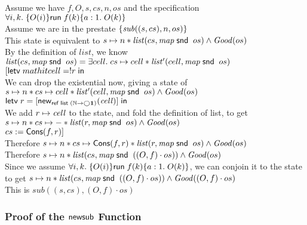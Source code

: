 \begin{tabbedproof}
\oo Assume we have $f, O, s, cs, n, os$ and the specification $\forall i,k.\;\{{O(i)}\}{\mathsf{run}\;{f(k)}}\{{a:1}.\;{O(k)}\}$ \\
\ooo Assume we are in the prestate $\{{\mathit{sub}((s,cs), n, os)}\}$ \\
\ooo This state is equivalent to $s \mapsto n * \mathit{list}(cs, \mathit{map}\;\mathsf{snd}\;\;os) \land \mathit{Good}(os)$ \\
\ooo By the definition of $\mathit{list}$, we know \\
\ooox $\mathit{list}(cs, \mathit{map}\;\mathsf{snd}\;\;os) = \exists cell.\;cs \mapsto cell * \mathit{list'}(cell, \mathit{map}\;\mathsf{snd}\;\;os)$ \\
\ooo $[\mathsf{letv}\;mathit{cell} = !r\;\mathsf{in}\;$ \\
\ooo We can drop the existential now, giving a state of \\
\ooox $s \mapsto n * cs \mapsto cell * \mathit{list'}(cell, \mathit{map}\;\mathsf{snd}\;\;os) \land \mathit{Good}(os)$ \\
\ooo $\mathsf{letv}\;r = [\mathsf{new}_{\mathsf{ref}\;\mathsf{list}\;{(\mathbb{N} \to \bigcirc{\mathbf{1}})}}(\mathit{cell})]\;\mathsf{in}\;$ \\
\ooo We add $r \mapsto \mathit{cell}$ to the state, and fold the definition of list, to get \\
\ooox $s \mapsto n * cs \mapsto - * \mathit{list}(r, \mathit{map}\;\mathsf{snd}\;\;os) \land \mathit{Good}(os)$ \\ 
\ooo $cs := \mathsf{Cons}(f, r)]$ \\
\ooo Therefore $s \mapsto n * cs \mapsto \mathsf{Cons}(f,r) * \mathit{list}(r, \mathit{map}\;\mathsf{snd}\;\;os) \land \mathit{Good}(os)$ \\ 
\ooo Therefore $s \mapsto n * \mathit{list}(cs, \mathit{map}\;\mathsf{snd}\;\;((O,f) \cdot os)) \land \mathit{Good}(os)$ \\ 
\ooo Since we assume $\forall i,k.\;\{{O(i)}\}{\mathsf{run}\;{f(k)}}\{{a:1}.\;{O(k)}\}$, we can conjoin it to the state \\
\ooox to get $s \mapsto n * \mathit{list}(cs, \mathit{map}\;\mathsf{snd}\;\;((O,f) \cdot os)) \land \mathit{Good}((O,f) \cdot os)$ \\ 
\ooo This is $\mathit{sub}((s,cs), (O,f)\cdot os)$
\end{tabbedproof}

\subsubsection{Proof of the $\mathsf{newsub}$ Function}

